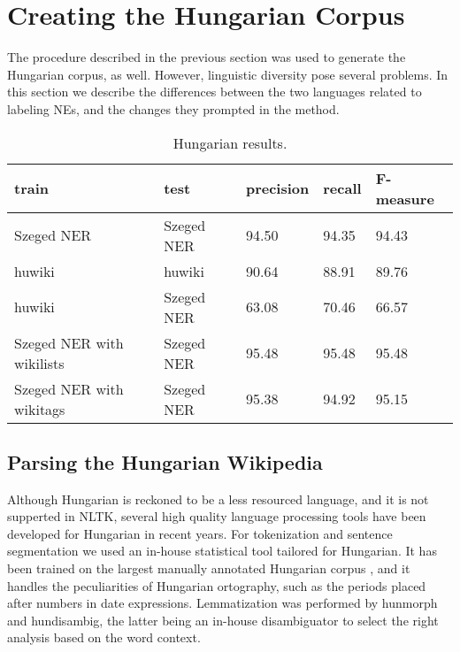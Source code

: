 \documentclass[11pt]{article}
\begin{document}
\section{Creating the Hungarian Corpus}
\label{sec:hun}

The procedure described in the previous section was used to generate the Hungarian corpus, as well. However, linguistic diversity pose several problems. In this section we describe the differences between the two languages related to labeling NEs, and the changes they prompted in the method.

\begin{table*}[ht]
\begin{center}
\begin{tabular}{lllll}
\hline \bf train & \bf test & \bf precision & \bf recall & \bf F-measure \\ \hline
Szeged NER & Szeged NER & 94.50 & 94.35 & 94.43 \\
huwiki & huwiki & 90.64 & 88.91 &  89.76 \\
huwiki & Szeged NER & 63.08 & 70.46 & 66.57 \\
Szeged NER with wikilists & Szeged NER & 95.48 & 95.48 & 95.48 \\
Szeged NER with wikitags & Szeged NER & 95.38 & 94.92 & 95.15 \\
\hline
\end{tabular}
\end{center}
\caption{\label{huresults} Hungarian results.}
\end{table*}

\subsection{Parsing the Hungarian Wikipedia}

Although Hungarian is reckoned to be a less resourced language, and it is not supperted in NLTK, several high quality language processing tools have been developed for Hungarian in recent years. For tokenization and sentence segmentation we used an in-house statistical tool tailored for Hungarian. It has been trained on the largest manually annotated Hungarian corpus \cite{Csendes:04}, and it handles the peculiarities of Hungarian ortography, such as the periods placed after numbers in date expressions. Lemmatization was performed by hunmorph \cite{Tron:05} and hundisambig, the latter being an in-house disambiguator to select the right analysis based on the word context. 

\end{document}
